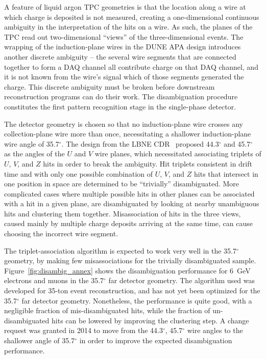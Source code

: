 A feature of liquid argon TPC geometries is that the location along a
wire at which charge is deposited is not measured, creating a
one-dimensional continuous ambiguity in the interpretation of the hits
on a wire.  As such, the planes of the TPC read out two-dimensional
``views'' of the three-dimensional events.  The wrapping of the
induction-plane wires in the DUNE APA design introduces another
discrete ambiguity -- the several wire segments that are connected
together to form a DAQ channel all contribute charge on that DAQ
channel, and it is not known from the wire's signal which of those
segments generated the charge.  This discrete ambiguity must be broken
before downstream reconstruction programs can do their work.
The disambiguation procedure constitutes the first pattern recognition stage 
in the single-phase detector.  

The detector geometry is chosen so that no induction-plane wire
crosses any collection-plane wire more than once, necessitating a
shallower induction-plane wire angle of 35.7$^\circ$.  The design from
the LBNE CDR~\cite{lbnecdr} proposed 44.3$^\circ$ and 45.7$^\circ$ as
the angles of the $U$ and $V$ wire planes, which necessitated
associating triplets of $U$, $V$, and $Z$ hits in order to break the
ambiguity.  Hit triplets consistent in drift time and with only one
possible combination of $U$, $V$, and $Z$ hits that intersect in one
position in space are determined to be ``trivially'' disambiguated.
More complicated cases where multiple possible hits in other planes
can be associated with a hit in a given plane, are disambiguated by
looking at nearby unambiguous hits and clustering them together.
Misassociation of hits in the three views, caused mainly by multiple
charge deposits arriving at the same time, can cause choosing the
incorrect wire segment.

The triplet-association algorithm is expected to work very well in the
35.7$^\circ$ geometry, by making few misassociations for the trivially
disambiguated sample.  Figure~\ref{fig:disambig_annex} shows the
disambiguation performance for 6~GeV electrons and muons in the
35.7$^\circ$ far detector geometry.  The algorithm used was developed for 35-ton event
reconstruction, and has not yet been optimized for the 35.7$^\circ$ far detector geometry.
Nonetheless, the performance is quite good, with a negligible fraction of mis-disambiguated hits,
while the fraction of un-disambiguated hits can be lowered by improving the clustering step.
A change request was granted in 2014 to
move from the 44.3$^\circ$, 45.7$^\circ$ wire angles to the shallower angle
of 35.7$^\circ$ in order to improve the expected disambiguation performance.

